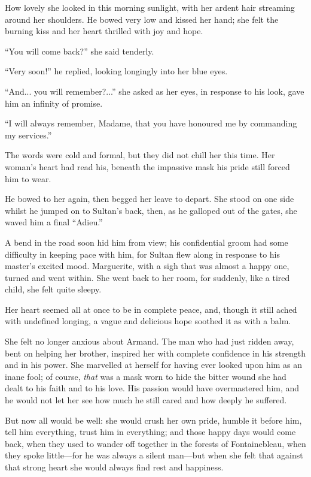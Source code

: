 \documentclass[paper=5.5in:8.5in,BCOR=7mm,twoside,DIV=calc,12pt,usegeometry,chapterprefix,endperiod,headings=big]{scrbook}
\begin{document}
How lovely she looked in this morning sunlight, with her ardent hair streaming around her shoulders. He bowed very low and kissed her hand; she felt the burning kiss and her heart thrilled with joy and hope.

\enquote{You will come back?} she said tenderly.

\enquote{Very soon!} he replied, looking longingly into her blue eyes.

\enquote{And... you will remember?...} she asked as her eyes, in response to his look, gave him an infinity of promise.

\enquote{I will always remember, Madame, that you have honoured me by commanding my services.}

The words were cold and formal, but they did not chill her this time. Her woman's heart had read his, beneath the impassive mask his pride still forced him to wear.

He bowed to her again, then begged her leave to depart. She stood on one side whilst he jumped on to Sultan's back, then, as he galloped out of the gates, she waved him a final \enquote{Adieu.}

A bend in the road soon hid him from view; his confidential groom had some difficulty in keeping pace with him, for Sultan flew along in response to his master's excited mood. Marguerite, with a sigh that was almost a happy one, turned and went within. She went back to her room, for suddenly, like a tired child, she felt quite sleepy.

Her heart seemed all at once to be in complete peace, and, though it still ached with undefined longing, a vague and delicious hope soothed it as with a balm.

She felt no longer anxious about Armand. The man who had just ridden away, bent on helping her brother, inspired her with complete confidence in his strength and in his power. She marvelled at herself for having ever looked upon him as an inane fool; of course, \textit{that} was a mask worn to hide the bitter wound she had dealt to his faith and to his love. His passion would have overmastered him, and he would not let her see how much he still cared and how deeply he suffered.

But now all would be well: she would crush her own pride, humble it before him, tell him everything, trust him in everything; and those happy days would come back, when they used to wander off together in the forests of Fontainebleau, when they spoke little---for he was always a silent man---but when she felt that against that strong heart she would always find rest and happiness.
\end{document}
